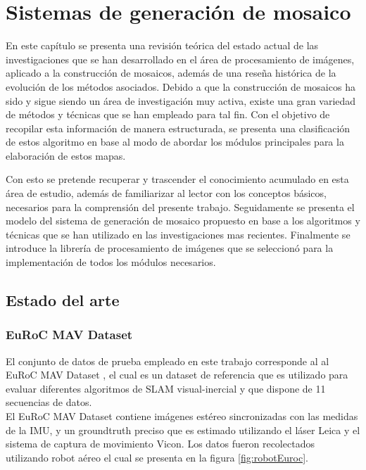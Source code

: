\chapter{Sistemas de generación de mosaico}
\label{capitulo2}

En este capítulo se presenta una revisión teórica del estado actual de las investigaciones que se han desarrollado en el área de procesamiento de imágenes, aplicado a la construcción de mosaicos, además de una reseña histórica de la evolución de los métodos asociados. Debido a que la construcción de mosaicos ha sido y sigue siendo un área de investigación muy activa, existe una gran variedad de métodos y técnicas que se han empleado para tal fin. Con el objetivo de recopilar esta información de manera estructurada, se presenta una clasificación de estos algoritmo en base al modo de abordar los módulos principales para la elaboración de estos mapas.

Con esto se pretende recuperar y trascender el conocimiento acumulado en esta área de estudio, además de familiarizar al lector con los conceptos básicos, necesarios para la comprensión del presente trabajo. Seguidamente se presenta el modelo del sistema de generación de mosaico propuesto en base a los algoritmos y técnicas que se han utilizado en las investigaciones mas recientes. Finalmente se introduce la librería de procesamiento de imágenes que se seleccionó para la implementación de todos los módulos necesarios.

\section{Estado del arte}

\subsection{EuRoC MAV Dataset}
El conjunto de datos de prueba empleado en este trabajo corresponde al al EuRoC MAV Dataset \cite{0}, el cual es un dataset de referencia que es utilizado para evaluar diferentes algoritmos de SLAM visual-inercial y que dispone de 11 secuencias de datos. \\


El EuRoC MAV Dataset contiene imágenes estéreo sincronizadas con las medidas de la IMU,  y un groundtruth preciso que es estimado utilizando el láser Leica y el sistema de captura de movimiento Vicon. Los datos fueron recolectados utilizando robot aéreo el cual se presenta en la figura \ref{fig:robotEuroc}. \\

